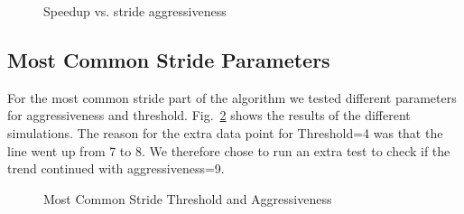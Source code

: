 \begin{figure}
	
	\caption{Speedup vs. stride aggressiveness}
	\label{fig:aggr}
\end{figure}

\subsection{Most Common Stride Parameters}

For the most common stride part of the algorithm we tested different parameters
for aggressiveness and threshold. Fig.~\ref{fig:mcs_tweaks} shows the results
of the different simulations.
The reason for the extra data point for Threshold=4 was that the line went
up from 7 to 8. We therefore chose to run an extra test to check if the
trend continued with aggressiveness=9.

\begin{figure}
	
	\caption{Most Common Stride Threshold and Aggressiveness}
	\label{fig:mcs_tweaks}
\end{figure}
